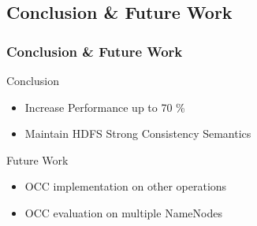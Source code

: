 \documentclass{beamer}
\begin{document}
\subsection{Conclusion \& Future Work}
\begin{frame}
	\frametitle{Conclusion \& Future Work}
	\begin{block}{Conclusion}
		\begin{itemize}
			\item Increase Performance up to 70 \%
			\item Maintain HDFS Strong Consistency Semantics
		\end{itemize}
	\end{block}
	\begin{block}{Future Work}
				\begin{itemize}
					\item OCC implementation on other operations
					\item OCC evaluation on multiple NameNodes
				\end{itemize}
	\end{block}
\end{frame}

%
%
%
%
%
%
%
%
%
\end{document}
